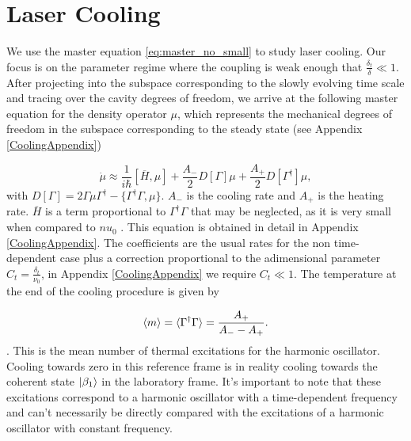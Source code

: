 \documentclass[reprint, amsmath,amssymb, aps,pra]{revtex4-1}
\begin{document}
\section{Laser Cooling}\label{LasCool}

We use the master equation \eqref{eq:master_no_small} to study laser
cooling. Our focus is on the parameter regime where the coupling is
weak enough that $\frac{\delta_t}{\delta}\ll 1$. After projecting into
the subspace corresponding to the slowly evolving time scale and
tracing over the cavity degrees of freedom, we arrive at the following
master equation for the density operator $\mu$, which represents the
mechanical degrees of freedom in the subspace corresponding to the
steady state (see Appendix \ref{CoolingAppendix})

\begin{equation}\label{eq:ProyectedMasterEqCooling}
\dot{\mu} \approx \frac{1}{i\hbar}[\overline{H},\mu] + \frac{A_-}{2}D[\Gamma]\mu + \frac{A_+}{2}D[\Gamma^\dagger]\mu, 
\end{equation}
with
$D[\Gamma] = 2\Gamma \mu \Gamma^\dagger -\{\Gamma^\dagger \Gamma,
\mu\}$. $A_-$ is the cooling rate and $A_+$ is the heating rate.
 $\overline{H}$ is a term proportional to
$\Gamma^\dagger \Gamma$ that may be neglected, as it is very small
when compared to $nu_0$ . This equation is obtained in detail in
Appendix \ref{CoolingAppendix}. The coefficients are the usual rates
for the non time-dependent case plus a correction proportional to the
adimensional parameter $C_t=\frac{\delta_t}{\nu_0}$, in Appendix
\ref{CoolingAppendix} we require $C_t \ll 1$. The temperature at the
end of the cooling procedure is given by

\begin{equation}
\expval{m} =\langle \Gamma^\dagger \Gamma \rangle = \frac{A_+}{A_- - A_+}.
\end{equation}
.
This is the mean number of thermal excitations for the harmonic
oscillator. Cooling towards zero in this reference frame is in
reality cooling towards the coherent state $\ket{\beta_1}$ in the
laboratory frame. It's important to note that these excitations
correspond to a harmonic oscillator with a time-dependent frequency
and can't necessarily be directly compared with the excitations of a
harmonic oscillator with constant frequency.
\end{document}
